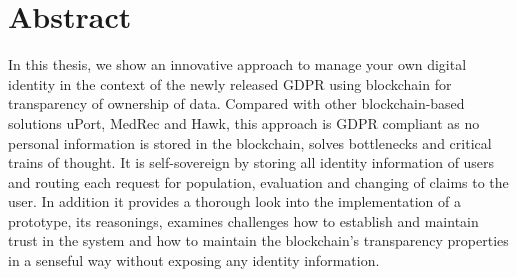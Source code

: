 \chapter*{Abstract}
\label{cha:abstract}

In this thesis, we show an innovative approach to manage your own digital identity in the context
of the newly released GDPR using blockchain for transparency of ownership of data.
Compared with other blockchain-based solutions uPort, MedRec and Hawk,
this approach is GDPR compliant as no personal information is stored in the blockchain, solves bottlenecks and critical
trains of thought.
It is self-sovereign by storing all identity information of users and routing each request for population, evaluation and
changing of claims to the user.
In addition it provides a thorough look into the implementation of a prototype, its reasonings, examines challenges
how to establish and maintain trust in the system and how to maintain the blockchain's transparency properties in a
senseful way without exposing any identity information.



